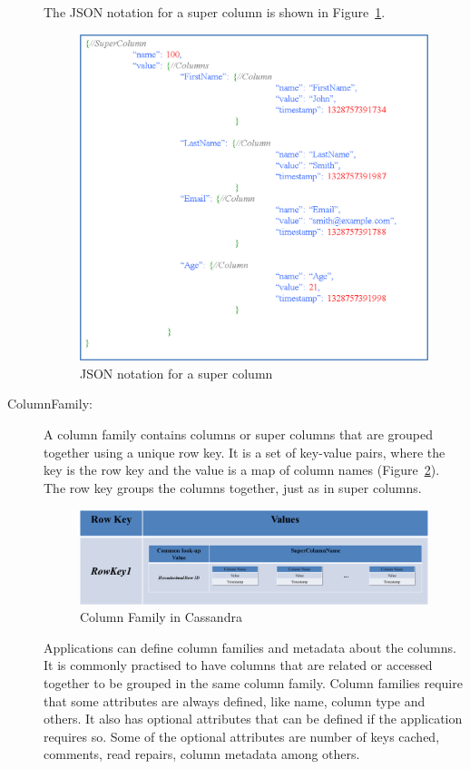 \begin{description}
The JSON notation for a super column is shown in Figure~\ref{f:supercolumn-JSON}. 

\begin{figure}[H]
	\centering
	\includegraphics[width=.7\textwidth]{./figure/Example/JSON_SuperColumn_John.png}
	\caption{JSON notation for a super column}\label{f:supercolumn-JSON}
\end{figure}

\item [ColumnFamily:] A column family contains columns or super columns that are
grouped together using a unique row key.  It is a set of key-value
pairs,   where the key is the row key and the value is a map of column names
(Figure~\ref{f:columnfamily}).  The row key groups the columns together,   just as
in super columns. 

\begin{figure}[H]
	\centering
	\includegraphics[width=.8\textwidth]{./figure/Example/ColumnFamily.png}
	\caption{Column Family in Cassandra}\label{f:columnfamily}
\end{figure}

Applications can define column families and metadata about the columns. 
It is commonly practised to have columns that are related or accessed
together to be grouped in the same column family.  Column families require that
some attributes are always defined,   like name,   column type and others.  It
also has optional attributes that can be defined if the application requires so.
 Some of the optional attributes are number of keys cached,   comments,   read
repairs,   column metadata among others.


\end{description}
